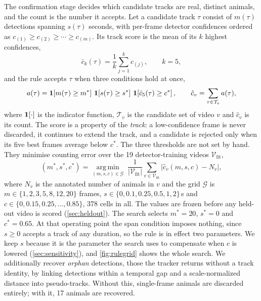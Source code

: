 The confirmation stage decides which candidate tracks are real, distinct animals, and the
count is the number it accepts. Let a candidate track $\tau$ consist of $m(\tau)$
detections spanning $s(\tau)$ seconds, with per-frame detector confidences ordered as
$c_{(1)}\ge c_{(2)}\ge\cdots\ge c_{(m)}$. Its track score is the mean of its $k$ highest
confidences,
\begin{equation}
\bar{c}_k(\tau)=\frac{1}{k}\sum_{j=1}^{k} c_{(j)},\qquad k=5,
\label{eq:topk}
\end{equation}
and the rule accepts $\tau$ when three conditions hold at once,
\begin{equation}
a(\tau)=\mathbf{1}\!\left[m(\tau)\ge m^{*}\right]\,\mathbf{1}\!\left[s(\tau)\ge s^{*}\right]\,
\mathbf{1}\!\left[\bar{c}_5(\tau)\ge c^{*}\right],
\qquad
\hat{c}_v=\sum_{\tau\in\mathcal{T}_v} a(\tau),
\label{eq:rule}
\end{equation}
where $\mathbf{1}[\cdot]$ is the indicator function, $\mathcal{T}_v$ is the candidate set of video
$v$ and $\hat{c}_v$ is its count. The score is a property of the \emph{track}: a
low-confidence frame is never discarded, it continues to extend the track, and a candidate
is rejected only when its five best frames average below $c^{*}$. The three thresholds are
not set by hand. They minimise counting error over the 19 detector-training videos
$\mathcal{V}_{\mathrm{fit}}$,
\begin{equation}
(m^{*},s^{*},c^{*})=\operatorname*{arg\,min}_{(m,s,c)\in\mathcal{G}}\;
\frac{1}{|\mathcal{V}_{\mathrm{fit}}|}\sum_{v\in\mathcal{V}_{\mathrm{fit}}}
\bigl|\hat{c}_v(m,s,c)-N_v\bigr|,
\label{eq:gridsearch}
\end{equation}
where $N_v$ is the annotated number of animals in $v$ and the grid $\mathcal{G}$ is
$m\in\{1,2,3,5,8,12,20\}$ frames, $s\in\{0,0.1,0.25,0.5,1,2\}$\,s and
$c\in\{0,0.15,0.25,\dots,0.85\}$, 378 cells in all. The values are frozen before any
held-out video is scored (\cref{sec:heldout}). The search selects $m^{*}=20$, $s^{*}=0$ and
$c^{*}=0.65$. At that operating point the span condition imposes nothing, since $s\ge0$
accepts a track of any duration, so the rule is in effect two parameters. We keep $s$
because it is the parameter the search uses to compensate when $c$ is lowered
(\cref{sec:sensitivity}), and \cref{fig:rulegrid} shows the whole search. We additionally
recover \emph{orphan} detections, those the tracker returns without a track identity, by
linking detections within a temporal gap and a scale-normalized distance into pseudo-tracks.
Without this, single-frame animals are discarded entirely; with it, 17 animals are
recovered.

